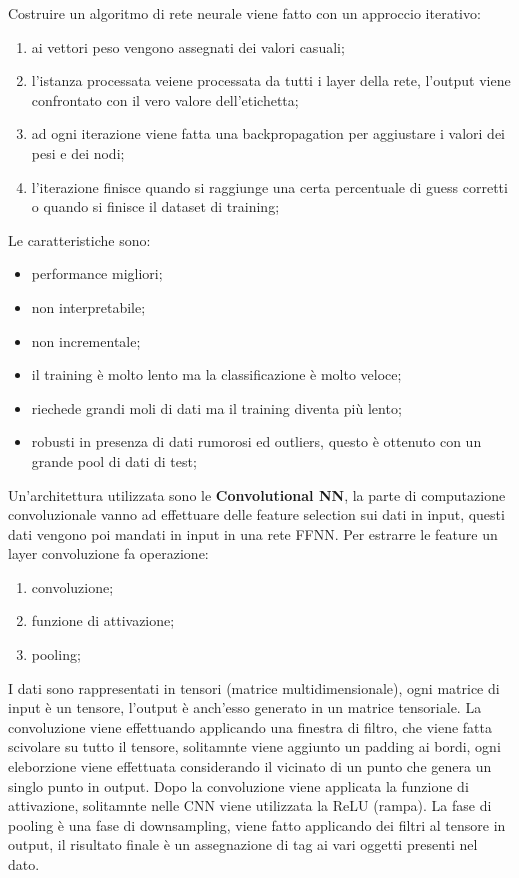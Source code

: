 \documentclass[12pt]{article}
\begin{document}
Costruire un algoritmo di rete neurale viene fatto con un approccio iterativo:
\begin{enumerate}
    \item ai vettori peso vengono assegnati dei valori casuali;
    \item l'istanza processata veiene processata da tutti i layer della rete, l'output viene confrontato con il vero valore dell'etichetta;
    \item ad ogni iterazione viene fatta una backpropagation per aggiustare i valori dei pesi e dei nodi;
    \item l'iterazione finisce quando si raggiunge una certa percentuale di guess corretti o quando si finisce il dataset di training;
\end{enumerate}

Le caratteristiche sono:
\begin{itemize}
    \item performance migliori;
    \item non interpretabile;
    \item non incrementale;
    \item il training \`e molto lento ma la classificazione \`e molto veloce;
    \item riechede grandi moli di dati ma il training diventa pi\`u lento;
    \item robusti in presenza di dati rumorosi ed outliers, questo \`e ottenuto con un grande pool di dati di test;
\end{itemize}

Un'architettura utilizzata sono le \textbf{Convolutional NN}, la parte di computazione convoluzionale vanno ad effettuare delle feature selection sui dati in input, questi dati vengono poi mandati in input in una rete FFNN. Per estrarre le feature un layer convoluzione fa operazione:
\begin{enumerate}
    \item convoluzione;
    \item funzione di attivazione;
    \item pooling;
\end{enumerate}
I dati sono rappresentati in tensori (matrice multidimensionale), ogni matrice di input \`e un tensore, l'output \`e anch'esso generato in un matrice tensoriale. La convoluzione viene effettuando applicando una finestra di filtro, che viene fatta scivolare su tutto il tensore, solitamnte viene aggiunto un padding ai bordi, ogni eleborzione viene effettuata considerando il vicinato di un punto che genera un singlo punto in output. Dopo la convoluzione viene applicata la funzione di attivazione, solitamnte nelle CNN viene utilizzata la ReLU (rampa). La fase di pooling \`e una fase di downsampling, viene fatto applicando dei filtri al tensore in output, il risultato finale \`e un assegnazione di tag ai vari oggetti presenti nel dato.
\end{document}
